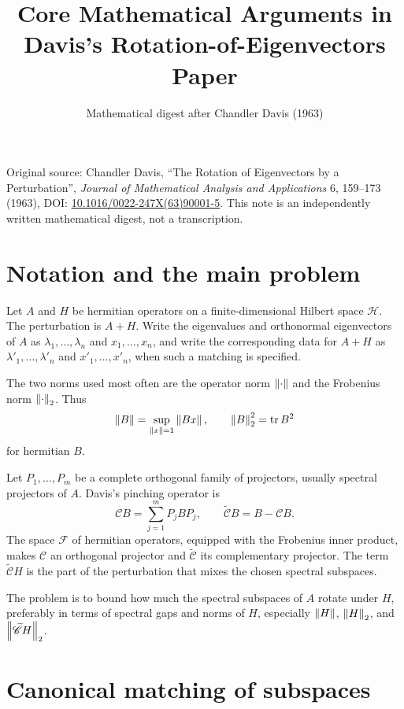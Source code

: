 \documentclass[11pt]{article}
\title{Core Mathematical Arguments in Davis's Rotation-of-Eigenvectors Paper}
\author{Mathematical digest after Chandler Davis (1963)}
\date{}
\newcommand{\Hsp}{\mathscr{H}}
\newcommand{\Fsp}{\mathscr{F}}
\newcommand{\Pinch}{\mathscr{C}}
\newcommand{\Off}{\widetilde{\mathscr{C}}}
\newcommand{\Hsp}{\mathcal{H}}
\newcommand{\Fsp}{\mathcal{F}}
\newcommand{\Pinch}{\mathcal{D}}
\newcommand{\Off}{\mathcal{D}^{\perp}}
\newcommand{\tr}{\operatorname{tr}}
\newcommand{\lam}{\lambda}
\newcommand{\hlam}{\lambda'}
\theoremstyle{definition}
\begin{document}
\maketitle

\begin{center}
\small
Original source: Chandler Davis, ``The Rotation of Eigenvectors by a Perturbation'',
\emph{Journal of Mathematical Analysis and Applications} 6, 159--173 (1963),
DOI: \href{https://doi.org/10.1016/0022-247X(63)90001-5}{10.1016/0022-247X(63)90001-5}.
This note is an independently written mathematical digest, not a transcription.
\end{center}

\section{Notation and the main problem}

Let \(A\) and \(H\) be hermitian operators on a finite-dimensional Hilbert
space \(\Hsp\).  The perturbation is \(A+H\).  Write the eigenvalues and
orthonormal eigenvectors of \(A\) as \(\lam_1,\ldots,\lam_n\) and
\(x_1,\ldots,x_n\), and write the corresponding data for \(A+H\) as
\(\hlam_1,\ldots,\hlam_n\) and \(x'_1,\ldots,x'_n\), when such a matching is
specified.

The two norms used most often are the operator norm \(\blanknorm\) and the
Frobenius norm \(\blanknorm[2]\).  Thus
\[
  \norm{B}=\sup_{\norm{x}=1}\norm{Bx},
  \qquad
  \norm[2]{B}^2=\tr B^2
\]
for hermitian \(B\).

Let \(P_1,\ldots,P_m\) be a complete orthogonal family of projectors, usually
spectral projectors of \(A\).  Davis's pinching operator is
\[
  \Pinch B = \sum_{j=1}^m P_j B P_j,
  \qquad
  \Off B = B-\Pinch B.
\]
The space \(\Fsp\) of hermitian operators, equipped with the Frobenius inner
product, makes \(\Pinch\) an orthogonal projector and \(\Off\) its complementary
projector.  The term \(\Off H\) is the part of the perturbation that mixes the
chosen spectral subspaces.

The problem is to bound how much the spectral subspaces of \(A\) rotate under
\(H\), preferably in terms of spectral gaps and norms of \(H\), especially
\(\norm{H}\), \(\norm[2]{H}\), and \(\norm[2]{\Off H}\).

\section{Canonical matching of subspaces}
\end{document}
